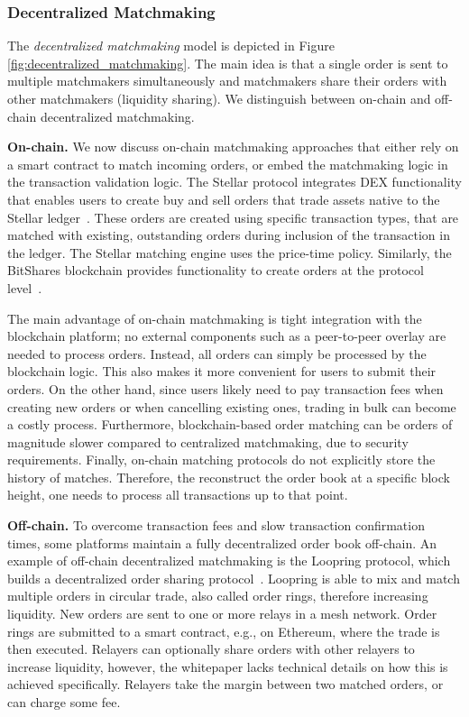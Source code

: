 \subsubsection{Decentralized Matchmaking}
The \emph{decentralized matchmaking} model is depicted in Figure \ref{fig:decentralized_matchmaking}.
The main idea is that a single order is sent to multiple matchmakers simultaneously and matchmakers share their orders with other matchmakers (liquidity sharing).
We distinguish between on-chain and off-chain decentralized matchmaking.

\textbf{On-chain.}
We now discuss on-chain matchmaking approaches that either rely on a smart contract to match incoming orders, or embed the matchmaking logic in the transaction validation logic.
The Stellar protocol integrates DEX functionality that enables users to create buy and sell orders that trade assets native to the Stellar ledger~\cite{Lokhava:2019kd}.
These orders are created using specific transaction types, that are matched with existing, outstanding orders during inclusion of the transaction in the ledger.
The Stellar matching engine uses the price-time policy.
Similarly, the BitShares blockchain provides functionality to create orders at the protocol level~\cite{Schuh:CsvWDxUZ}.

The main advantage of on-chain matchmaking is tight integration with the blockchain platform; no external components such as a peer-to-peer overlay are needed to process orders.
Instead, all orders can simply be processed by the blockchain logic.
This also makes it more convenient for users to submit their orders.
On the other hand, since users likely need to pay transaction fees when creating new orders or when cancelling existing ones, trading in bulk can become a costly process.
Furthermore, blockchain-based order matching can be orders of magnitude slower compared to centralized matchmaking, due to security requirements.
Finally, on-chain matching protocols do not explicitly store the history of matches.
Therefore, the reconstruct the order book at a specific block height, one needs to process all transactions up to that point.

\textbf{Off-chain.}
To overcome transaction fees and slow transaction confirmation times, some platforms maintain a fully decentralized order book off-chain.
An example of off-chain decentralized matchmaking is the Loopring protocol, which builds a decentralized order sharing protocol~\cite{Wang:wt}.
Loopring is able to mix and match multiple orders in circular trade, also called order rings, therefore increasing liquidity.
New orders are sent to one or more relays in a mesh network.
Order rings are submitted to a smart contract, e.g., on Ethereum, where the trade is then executed.
Relayers can optionally share orders with other relayers to increase liquidity, however, the whitepaper lacks technical details on how this is achieved specifically.
Relayers take the margin between two matched orders, or can charge some fee.

